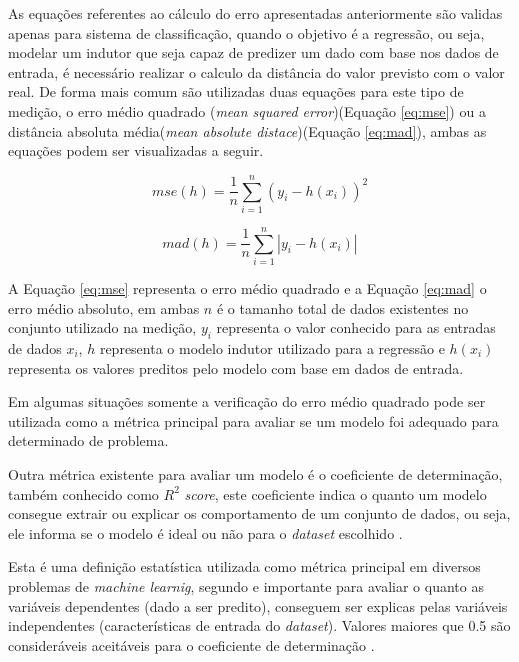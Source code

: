 \documentclass[
12pt,				%
oneside,			%
a4paper,			%
english,			%
french,				%
spanish,			%
brazil				%
]{abntex2}
\begin{document}
As equações referentes ao cálculo do erro apresentadas anteriormente são validas apenas para sistema de classificação, quando o objetivo é a regressão, ou seja, modelar um indutor que seja capaz de predizer um dado com base nos dados de entrada, é necessário realizar o calculo da distância do valor previsto com o valor real. De forma mais comum são utilizadas duas equações para este tipo de medição, o erro médio quadrado (\textit{mean squared error})(Equação \ref{eq:mse}) ou a distância absoluta média(\textit{mean absolute distace})(Equação \ref{eq:mad}), ambas as equações podem ser visualizadas a seguir.

\begin{equation}
mse(h) = \frac{1}{n}\sum_{i=1}^{n}(y_{i}-h(x_{i}))^2 
\label{eq:mse}
\end{equation} 

\begin{equation}
mad(h) = \frac{1}{n}\sum_{i=1}^{n}|y_{i}-h(x_{i})| 
\label{eq:mad}
\end{equation} 

A Equação \ref{eq:mse} representa o erro médio quadrado e a Equação \ref{eq:mad} o erro médio absoluto, em ambas $n$ é o tamanho total de dados existentes no conjunto utilizado na medição, $y_{i}$ representa o valor conhecido para as entradas de dados $x_{i}$, $h$ representa o modelo indutor utilizado para a regressão e $h(x_{i})$ representa os valores preditos pelo modelo com base em dados de entrada. 

Em algumas situações somente a verificação do erro médio quadrado pode ser utilizada como a métrica principal para avaliar se um modelo foi adequado para determinado de problema.

Outra métrica existente para avaliar um modelo é o coeficiente de determinação, também conhecido como $R^2$ \textit{score}, este coeficiente indica o quanto um modelo consegue extrair ou explicar os comportamento de um conjunto de dados, ou seja, ele informa se o modelo é ideal ou não para o \textit{dataset} escolhido \cite{tjur2009coefficients}. 

Esta é uma definição estatística utilizada como métrica principal em diversos problemas de \textit{machine learnig}, segundo \cite{nagelkerke1991note} e importante para avaliar o quanto as variáveis dependentes (dado a ser predito), conseguem ser explicas pelas variáveis independentes (características de entrada do \textit{dataset}). Valores maiores que 0.5 são consideráveis aceitáveis para o coeficiente de determinação \cite{starnes2010practice}.
\end{document}

